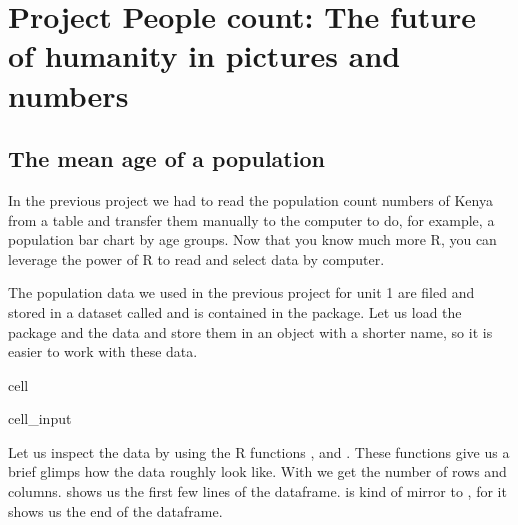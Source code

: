 \documentclass[letterpaper,10pt,english]{jupyterBook}
\begin{document}
\section{Project People count: The future of humanity in pictures and numbers}
\label{\detokenize{exercises_unit_2:project-people-count-the-future-of-humanity-in-pictures-and-numbers}}

\subsection{The mean age of a population}
\label{\detokenize{exercises_unit_2:the-mean-age-of-a-population}}
\sphinxAtStartPar
In the previous project we had to read the population count numbers of Kenya from a table and transfer them manually to the computer to do, for example, a population bar chart by age groups. Now that you know much more R, you can leverage the power of R to read and select data by computer.

\sphinxAtStartPar
The population data we used in the previous project for unit 1 are filed and stored in a dataset called
 and is contained in the  package. Let us load the package and the data and store them in an object with a shorter name, so it is easier to work with these data.

\begin{sphinxuseclass}{cell}\begin{sphinxVerbatimInput}

\begin{sphinxuseclass}{cell_input}
\begin{sphinxVerbatim}[commandchars=\\\{\}]
\end{sphinxVerbatim}

\end{sphinxuseclass}\end{sphinxVerbatimInput}

\end{sphinxuseclass}
\sphinxAtStartPar
Let us inspect the data by using the R functions , and . These functions give us a brief glimps how the data roughly look like. With we get the number of rows and columns. shows us the first few lines of the dataframe.  is kind of mirror to , for it shows us the end of the dataframe.
\end{document}
